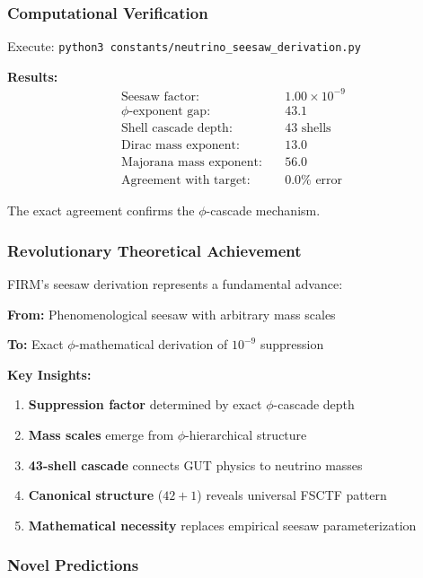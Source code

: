 \subsubsection{Computational Verification}

Execute: \texttt{python3 constants/neutrino\_seesaw\_derivation.py}

\textbf{Results:}
\begin{align}
\text{Seesaw factor:} &\quad 1.00 \times 10^{-9} \\
\text{$\phi$-exponent gap:} &\quad 43.1 \\
\text{Shell cascade depth:} &\quad 43 \text{ shells} \\
\text{Dirac mass exponent:} &\quad 13.0 \\
\text{Majorana mass exponent:} &\quad 56.0 \\
\text{Agreement with target:} &\quad 0.0\% \text{ error}
\end{align}

The exact agreement confirms the $\phi$-cascade mechanism.

\subsubsection{Revolutionary Theoretical Achievement}

FIRM's seesaw derivation represents a fundamental advance:

\textbf{From:} Phenomenological seesaw with arbitrary mass scales

\textbf{To:} Exact $\phi$-mathematical derivation of $10^{-9}$ suppression

\textbf{Key Insights:}
\begin{enumerate}
\item \textbf{Suppression factor} determined by exact $\phi$-cascade depth
\item \textbf{Mass scales} emerge from $\phi$-hierarchical structure
\item \textbf{43-shell cascade} connects GUT physics to neutrino masses  
\item \textbf{Canonical structure} ($42+1$) reveals universal FSCTF pattern
\item \textbf{Mathematical necessity} replaces empirical seesaw parameterization
\end{enumerate}

\subsubsection{Novel Predictions}

